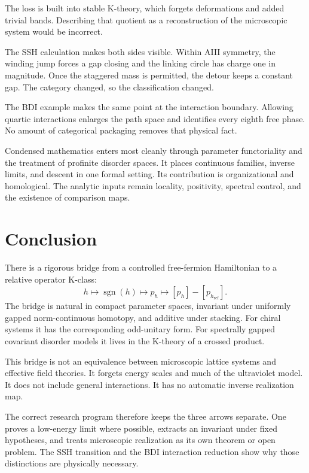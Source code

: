 \documentclass[12pt]{article}
\theoremstyle{definition}
\theoremstyle{remark}
\newcommand{\sgn}{\operatorname{sgn}}
\begin{document}
The loss is built into stable K-theory, which forgets deformations and added
trivial bands.
Describing that quotient as a reconstruction of the microscopic system would
be incorrect.

The SSH calculation makes both sides visible.
Within AIII symmetry, the winding jump forces a gap closing and the linking
circle has charge one in magnitude.
Once the staggered mass is permitted, the detour keeps a constant gap.
The category changed, so the classification changed.

The BDI example makes the same point at the interaction boundary.
Allowing quartic interactions enlarges the path space and identifies every
eighth free phase.
No amount of categorical packaging removes that physical fact.

Condensed mathematics enters most cleanly through parameter functoriality and
the treatment of profinite disorder spaces.
It places continuous families, inverse limits, and descent in one formal
setting.
Its contribution is organizational and homological.
The analytic inputs remain locality, positivity, spectral control, and the
existence of comparison maps.

\section{Conclusion}

There is a rigorous bridge from a controlled free-fermion Hamiltonian to a
relative operator K-class:
\[
h
\longmapsto
\sgn(h)
\longmapsto
p_h
\longmapsto
[p_h]-[p_{h_{\mathrm{ref}}}].
\]
The bridge is natural in compact parameter spaces, invariant under uniformly
gapped norm-continuous homotopy, and additive under stacking.
For chiral systems it has the corresponding odd-unitary form.
For spectrally gapped covariant disorder models it lives in the K-theory of a
crossed product.

This bridge is not an equivalence between microscopic lattice systems and
effective field theories.
It forgets energy scales and much of the ultraviolet model.
It does not include general interactions.
It has no automatic inverse realization map.

The correct research program therefore keeps the three arrows separate.
One proves a low-energy limit where possible, extracts an invariant under
fixed hypotheses, and treats microscopic realization as its own theorem or
open problem.
The SSH transition and the BDI interaction reduction show why those
distinctions are physically necessary.
\end{document}
